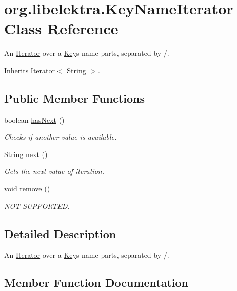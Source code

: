 \hypertarget{classorg_1_1libelektra_1_1KeyNameIterator}{}\section{org.\+libelektra.\+Key\+Name\+Iterator Class Reference}
\label{classorg_1_1libelektra_1_1KeyNameIterator}


An \hyperlink{}{Iterator} over a \hyperlink{classorg_1_1libelektra_1_1Key}{Key}\textquotesingle{}s name parts, separated by /.  




Inherits Iterator$<$ String $>$.

\subsection*{Public Member Functions}
\begin{DoxyCompactItemize}
\item 
boolean \hyperlink{classorg_1_1libelektra_1_1KeyNameIterator_aef0fa42475eb9bbc3477493826566889}{has\+Next} ()
\begin{DoxyCompactList}\small\item\em Checks if another value is available. \end{DoxyCompactList}\item 
String \hyperlink{classorg_1_1libelektra_1_1KeyNameIterator_af97f8c817570172eb67e121d9cbf68a2}{next} ()
\begin{DoxyCompactList}\small\item\em Gets the next value of iteration. \end{DoxyCompactList}\item 
void \hyperlink{classorg_1_1libelektra_1_1KeyNameIterator_aed2ee18e452c6e5efb893444dcccfda3}{remove} ()
\begin{DoxyCompactList}\small\item\em N\+OT S\+U\+P\+P\+O\+R\+T\+ED. \end{DoxyCompactList}\end{DoxyCompactItemize}


\subsection{Detailed Description}
An \hyperlink{}{Iterator} over a \hyperlink{classorg_1_1libelektra_1_1Key}{Key}\textquotesingle{}s name parts, separated by /. 

\subsection{Member Function Documentation}
\mbox{\label{classorg_1_1libelektra_1_1KeyNameIterator_aef0fa42475eb9bbc3477493826566889}} 
